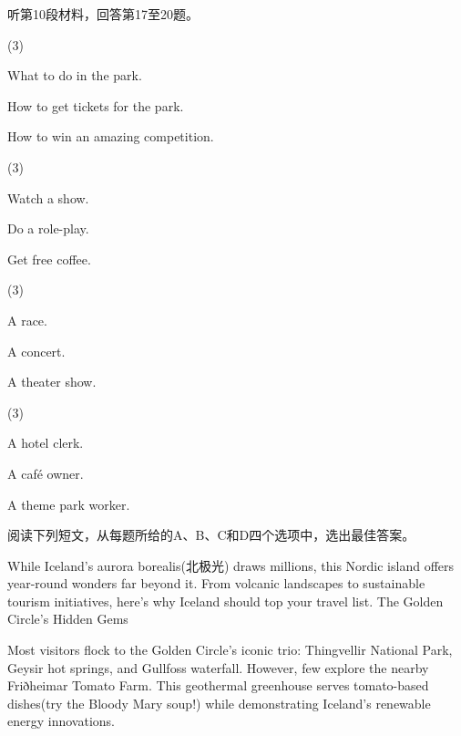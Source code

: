\documentclass{英语试卷}
\begin{document}
\par 听第10段材料，回答第17至20题。\par
{}
\begin{choices}(3)
  \item What to do in the park.
  \item How to get tickets for the park.
  \item How to win an amazing competition.
\end{choices}
\begin{choices}(3)
  \item Watch a show.
  \item Do a role-play.
  \item Get free coffee.
\end{choices}
\begin{choices}(3)
  \item A race.
  \item A concert.
  \item A theater show.
\end{choices}
\begin{choices}(3)
  \item A hotel clerk.
  \item A café owner.
  \item A theme park worker.
\end{choices}
\par 阅读下列短文，从每题所给的A、B、C和D四个选项中，选出最佳答案。\par
{}
\par While Iceland's aurora borealis(北极光) draws millions, this Nordic island offers year-round wonders far beyond it. From volcanic landscapes to sustainable tourism initiatives, here's why Iceland should top your travel list. The Golden Circle's Hidden Gems\par
\par Most visitors flock to the Golden Circle's iconic trio: Thingvellir National Park, Geysir hot springs, and Gullfoss waterfall. However, few explore the nearby Friðheimar Tomato Farm. This geothermal greenhouse serves tomato-based dishes(try the Bloody Mary soup!) while demonstrating Iceland's renewable energy innovations.\par
\end{document}
